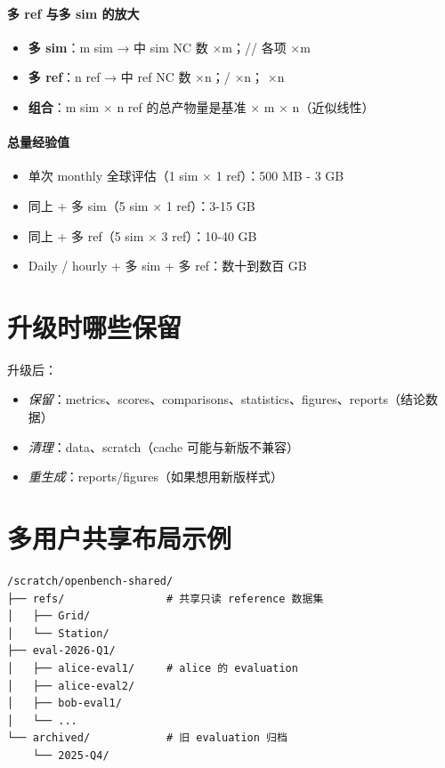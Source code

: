 \paragraph{多 ref 与多 sim 的放大}

\begin{itemize}
  \item \textbf{多 sim}：m sim →  中 sim NC 数 ×m；// 各项 ×m
  \item \textbf{多 ref}：n ref →  中 ref NC 数 ×n；/ ×n； ×n
  \item \textbf{组合}：m sim × n ref 的总产物量是基准 × m × n（近似线性）
\end{itemize}

\paragraph{总量经验值}

\begin{itemize}
  \item 单次 monthly 全球评估（1 sim × 1 ref）：500 MB - 3 GB
  \item 同上 + 多 sim（5 sim × 1 ref）：3-15 GB
  \item 同上 + 多 ref（5 sim × 3 ref）：10-40 GB
  \item Daily / hourly + 多 sim + 多 ref：数十到数百 GB
\end{itemize}

\section{升级时哪些保留}

\openbench{} 升级后：

\begin{itemize}
  \item \emph{保留}：metrics、scores、comparisons、statistics、figures、reports（结论数据）
  \item \emph{清理}：data、scratch（cache 可能与新版不兼容）
  \item \emph{重生成}：reports/figures（如果想用新版样式）
\end{itemize}

\section{多用户共享布局示例}

\begin{verbatim}
/scratch/openbench-shared/
├── refs/                # 共享只读 reference 数据集
│   ├── Grid/
│   └── Station/
├── eval-2026-Q1/
│   ├── alice-eval1/     # alice 的 evaluation
│   ├── alice-eval2/
│   ├── bob-eval1/
│   └── ...
└── archived/            # 旧 evaluation 归档
    └── 2025-Q4/
\end{verbatim}

